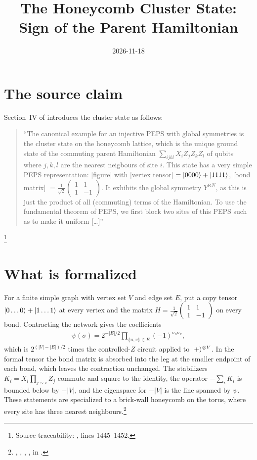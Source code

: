 \documentclass{article}
\title{The Honeycomb Cluster State: Sign of the Parent Hamiltonian}
\author{}
\date{2026-11-18}
\begin{document}
\maketitle
{}

\section{The source claim}
Section~IV of \cite{Cirac2021Matrix} introduces the cluster state as follows:
\begin{quote}
    ``The canonical example for an injective PEPS with global symmetries is
    the cluster state on the honeycomb lattice, which is the unique ground
    state of the commuting parent Hamiltonian $\sum_{ijkl}X_iZ_jZ_kZ_l$ of
    qubits where $j,k,l$ are the nearest neigbours of site $i$. This state
    has a very simple PEPS representation: [figure] with [vertex tensor]
    $=|0000\rangle+|1111\rangle$, [bond matrix]
    $=\frac{1}{\sqrt{2}}\left(\begin{smallmatrix} 1 & 1\\ 1 &
                -1\end{smallmatrix}\right)$.
    It exhibits the global symmetry $Y^{\otimes N}$, as this is just the
    product of all (commuting) terms of the Hamiltonian. To use the
    fundamental theorem of PEPS, we first block two sites of this PEPS such
    as to make it uniform [\ldots]''
\end{quote}
\footnote{Source traceability: ,
    lines 1445--1452.}

\section{What is formalized}
For a finite simple graph with vertex set $V$ and edge set $E$, put a copy
tensor $|0\ldots0\rangle+|1\ldots1\rangle$ at every vertex and the matrix
$H=\frac1{\sqrt2}\left(\begin{smallmatrix}1&1\\1&-1\end{smallmatrix}\right)$
on every bond. Contracting the network gives the coefficients
\begin{align}
    \psi(\sigma)=2^{-|E|/2}\prod_{\{u,v\}\in E}(-1)^{\sigma_u\sigma_v},
    \label{eq:rmp_honeycomb_cluster_peps_coefficient}
\end{align}
which is $2^{(|V|-|E|)/2}$ times the controlled-$Z$ circuit applied to
$|+\rangle^{\otimes V}$. In the formal tensor the bond matrix is absorbed into
the leg at the smaller endpoint of each bond, which leaves the contraction
unchanged. The stabilizers $K_i=X_i\prod_{j\sim i}Z_j$ commute and square
to the identity, the operator $-\sum_iK_i$ is bounded below by $-|V|$, and
the eigenspace for $-|V|$ is the line spanned by $\psi$. These statements
are specialized to a brick-wall honeycomb on the torus, where every site
has three nearest neighbours.\footnote{,
    ,
    ,
    , in
    .}
\end{document}
